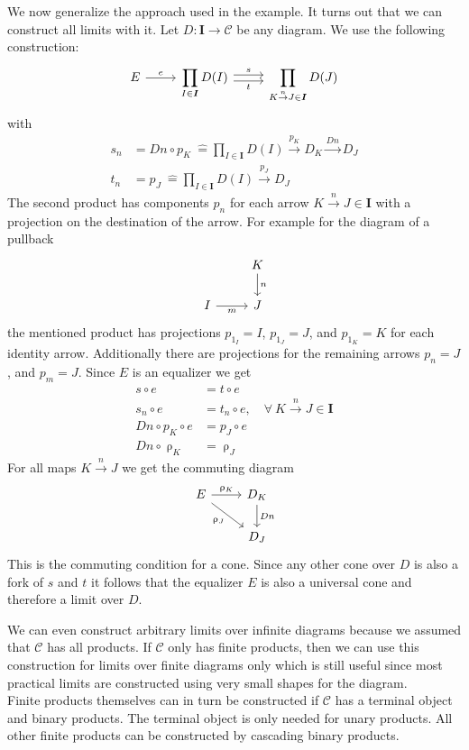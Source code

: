 We now generalize
the approach used in the example. It turns out that we can construct all
limits with it.
Let $D : \bm I \to \mathscr C$ be any diagram.
We use the following construction:
\[
  \begin{tikzcd}
    E \arrow{r}{e} &
    \displaystyle \prod_{I \in \bm{I}} D(I)
    \arrow[r,shift left, "s"] \arrow[r,shift right,swap,"t"] &
    \displaystyle \prod_{K \overset{n}{\to} J \in \bm{I}} D(J)
  \end{tikzcd}
\]
with
\begin{align*}
  s_n &= Dn \circ p_K\ \hat{=} \prod_{I \in \bm{I}} D(I)
        \overset{p_K}{\rightarrow} D_K \overset{Dn}{\rightarrow} D_J \\
  t_n &= p_J\ \hat{=} \prod_{I \in \bm{I}} D(I)
        \overset{p_J}{\rightarrow} D_J
\end{align*}
The second product has components $p_n$ for each arrow
$K \overset{n}{\to} J \in \bm{I}$ with a projection on
the destination of the arrow.
For example for the diagram of a pullback
\[
  \begin{tikzcd}
    & K \arrow{d}{n} \\
    I \arrow[swap]{r}{m} & J
  \end{tikzcd}
\]
the mentioned product has projections $p_{1_I} = I$, $p_{1_J} = J$, and $p_{1_K} = K$
for each identity arrow.
Additionally there are projections for the remaining arrows $p_n = J$, and $p_m = J$.
Since $E$ is an equalizer we get
\begin{align*}
  s \circ e &= t \circ e\\
  s_n \circ e &= t_n \circ e, \quad \forall\ K \overset{n}{\rightarrow} J \in \bm I \\
  Dn \circ p_K \circ e &= p_J \circ e \\
  Dn \circ \uprho_K &= \uprho_J
\end{align*}
For all maps $K \overset{n}{\rightarrow} J$ we get the commuting diagram
\[
  \begin{tikzcd}
    E \arrow{r}{\uprho_K} \arrow{dr}[swap]{\uprho_J} & D_K \arrow{d}{Dn}\\
    & D_J
  \end{tikzcd}
\]
This is the commuting condition for a cone.
Since any other cone over $D$
is also a fork of $s$ and $t$
it follows that the equalizer $E$ is also a universal cone
and therefore a limit over $D$.

\begin{remark}
  We can even construct arbitrary limits over infinite diagrams
  because we assumed that $\mathscr C$ has all products.
  If $\mathscr C$ only has finite products, then we can
  use this construction for
  limits over finite diagrams only which is still useful since
  most practical limits are constructed using very small shapes for the diagram.\\
  Finite products themselves can in turn be constructed if $\mathscr C$
  has a terminal object and binary products. The terminal object is
  only needed for unary products. All other finite products
  can be constructed by cascading binary products.
\end{remark}

